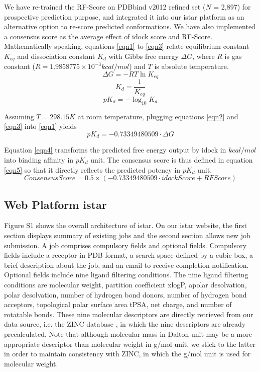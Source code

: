 We have re-trained the RF-Score on PDBbind v2012 refined set ($N$ = 2,897) for prospective prediction purpose, and integrated it into our istar platform as an alternative option to re-score predicted conformations. We have also implemented a consensus score as the average effect of idock score and RF-Score. Mathematically speaking, equations \eqref{eqn1} to \eqref{eqn3} relate equilibrium constant $K_{eq}$ and dissociation constant $K_d$ with Gibbs free energy $\Delta G$, where $R$ is gas constant ($R = 1.9858775 \times 10^{-3} kcal/mol$) and $T$ is absolute temperature.
\begin{equation}
\label{eqn1}
\Delta G = -RT\ln K_{eq}
\end{equation}
\begin{equation}
\label{eqn2}
K_d = \frac{1}{K_{eq}}
\end{equation}
\begin{equation}
\label{eqn3}
pK_d = -\log_{10} K_d
\end{equation}

Assuming $T = 298.15K$ at room temperature, plugging equations \eqref{eqn2} and \eqref{eqn3} into \eqref{eqn1} yields
\begin{equation}
\label{eqn4}
pK_d = -0.73349480509 \cdot \Delta G
\end{equation}

Equation \eqref{eqn4} transforms the predicted free energy output by idock in $kcal/mol$ into binding affinity in $pK_d$ unit. The consensus score is thus defined in equation \eqref{eqn5} so that it directly reflects the predicted potency in $pK_d$ unit.
\begin{equation}
\label{eqn5}
ConsensusScore = 0.5 \times (-0.73349480509 \cdot idockScore + RFScore)
\end{equation}

\subsection{Web Platform istar}
Figure S1 shows the overall architecture of istar. On our istar website, the first section displays summary of existing jobs and the second section allows new job submission. A job comprises compulsory fields and optional fields. Compulsory fields include a receptor in PDB format, a search space defined by a cubic box, a brief description about the job, and an email to receive completion notification. Optional fields include nine ligand filtering conditions. The nine ligand filtering conditions are molecular weight, partition coefficient xlogP, apolar desolvation, polar desolvation, number of hydrogen bond donors, number of hydrogen bond acceptors, topological polar surface area tPSA, net charge, and number of rotatable bonds. These nine molecular descriptors are directly retrieved from our data source, i.e. the ZINC database \cite{532,1178}, in which the nine descriptors are already precalculated. Note that although molecular mass in Dalton unit may be a more appropriate descriptor than molecular weight in g/mol unit, we stick to the latter in order to maintain consistency with ZINC, in which the g/mol unit is used for molecular weight.


